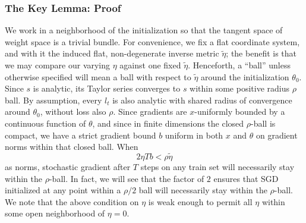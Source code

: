 \documentclass{article}
\theoremstyle{plain}
\theoremstyle{definition}
\begin{document}
        \subsubsection*{The Key Lemma: Proof}
            We work in a neighborhood of the initialization so that the tangent
            space of weight space is a trivial bundle.  For convenience, we fix
            a flat coordinate system, and with it the induced flat,
            non-degenerate inverse metric $\tilde\eta$; the benefit is that we
            may compare our varying $\eta$ against one fixed $\tilde\eta$.
            Henceforth, a ``ball'' unless otherwise specified will mean a ball
            with respect to $\tilde\eta$ around the initialization $\theta_0$.
            Since $s$ is analytic, its Taylor series converges to $s$ within
            some positive radius $\rho$ ball.  By assumption, every $l_t$ is
            also analytic with shared radius of convergence around $\theta_0$,
            without loss also $\rho$.  Since gradients are $x$-uniformly
            bounded by a continuous function of $\theta$, and since in finite
            dimensions the closed $\rho$-ball is compact, we have a strict
            gradient bound $b$ uniform in both $x$ and $\theta$ on gradient
            norms within that closed ball.  When
            \begin{equation} \label{eq:smalleta}
                2 \eta T b < \rho \tilde\eta
            \end{equation}
            as norms, stochastic gradient after $T$ steps on any train set
            will necessarily stay within the $\rho$-ball.  In fact, we will see
            that the factor of $2$ ensures that SGD initialized at any point
            within a $\rho/2$ ball will necessarily stay within the
            $\rho$-ball.  We note that the above condition on $\eta$ is weak
            enough to permit all $\eta$ within some open neighborhood of
            $\eta=0$.  
\end{document}
